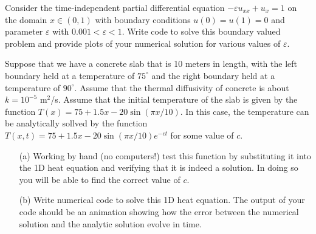 \begin{problem}
    Consider the time-independent partial differential equation $-\varepsilon u_{xx} +
    u_x = 1$ on the domain $x \in (0,1)$ with boundary conditions $u(0) = u(1) = 0$ and
    parameter $\varepsilon$ with $0.001<\varepsilon<1$.
    Write code to solve this boundary valued problem and provide plots of your numerical
    solution for various values of $\varepsilon$. 
\end{problem}


\begin{problem}
    Suppose that we have a concrete slab that is 10 meters in length, with the left
    boundary held at a temperature of $75^\circ$ and the right boundary held at a
    temperature of $90^\circ$.  Assume that the thermal diffusivity of concrete is about
    $k = 10^{-5}$ m$^2$/s.  Assume that the initial temperature of the slab is given by
    the function $T(x) = 75 + 1.5x - 20 \sin( \pi x / 10)$.  In this case, the temperature
    can be analytically sollved by the function $T(x,t) = 75 + 1.5x - 20 \sin(\pi x / 10)
    e^{-ct}$ for some value of $c$.  
    \begin{enumerate}
        \item[(a)] Working by hand (no computers!) test this function by substituting it
            into the 1D heat equation and verifying that it is indeed a solution.  In
            doing so you will be able to find the correct value of $c$.
        \item[(b)] Write numerical code to solve this 1D heat equation.  The output of
            your code should be an animation showing how the error between the numerical
            solution and the analytic solution evolve in time.
    \end{enumerate}
\end{problem}


